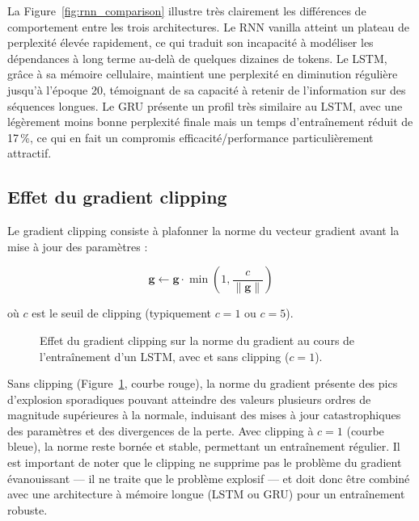\documentclass[11pt,a4paper]{article}
\begin{document}
La Figure~\ref{fig:rnn_comparison} illustre très clairement les différences de
comportement entre les trois architectures. Le RNN vanilla atteint un plateau de
perplexité élevée rapidement, ce qui traduit son incapacité à modéliser les dépendances
à long terme au-delà de quelques dizaines de tokens. Le LSTM, grâce à sa mémoire
cellulaire, maintient une perplexité en diminution régulière jusqu'à l'époque 20,
témoignant de sa capacité à retenir de l'information sur des séquences longues.
Le GRU présente un profil très similaire au LSTM, avec une légèrement moins bonne
perplexité finale mais un temps d'entraînement réduit de 17\,\%, ce qui en fait un
compromis efficacité/performance particulièrement attractif.

\subsection{Effet du gradient clipping}

Le gradient clipping consiste à plafonner la norme du vecteur gradient avant la mise
à jour des paramètres :

\begin{equation}
  \mathbf{g} \leftarrow \mathbf{g} \cdot \min\!\left(1, \frac{c}{\|\mathbf{g}\|}\right)
  \label{eq:grad_clip}
\end{equation}

où $c$ est le seuil de clipping (typiquement $c = 1$ ou $c = 5$).

\begin{figure}[H]
  \centering
  \caption{Effet du gradient clipping sur la norme du gradient au cours de l'entraînement
           d'un LSTM, avec et sans clipping ($c = 1$).}
  \label{fig:grad_clipping}
\end{figure}

Sans clipping (Figure~\ref{fig:grad_clipping}, courbe rouge), la norme du gradient
présente des pics d'explosion sporadiques pouvant atteindre des valeurs
plusieurs ordres de magnitude supérieures à la normale, induisant des mises à jour
catastrophiques des paramètres et des divergences de la perte. Avec clipping à $c = 1$
(courbe bleue), la norme reste bornée et stable, permettant un entraînement régulier.
Il est important de noter que le clipping ne supprime pas le problème du gradient
évanouissant — il ne traite que le problème explosif — et doit donc être combiné
avec une architecture à mémoire longue (LSTM ou GRU) pour un entraînement robuste.
\end{document}
